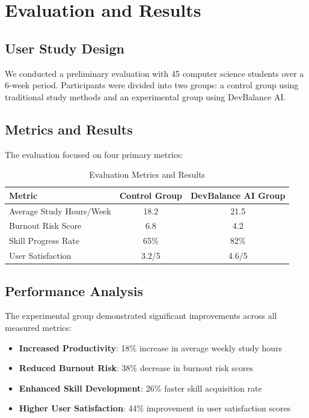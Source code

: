 \documentclass[conference,10pt]{IEEEtran}
\begin{document}
\section{Evaluation and Results}

\subsection{User Study Design}

We conducted a preliminary evaluation with 45 computer science students over a 6-week period. Participants were divided into two groups: a control group using traditional study methods and an experimental group using DevBalance AI.

\subsection{Metrics and Results}

The evaluation focused on four primary metrics:

\begin{table}[h]
\centering
\caption{Evaluation Metrics and Results}
\begin{tabular}{lcc}
\toprule
\textbf{Metric} & \textbf{Control Group} & \textbf{DevBalance AI Group} \\
\midrule
Average Study Hours/Week & 18.2 & 21.5 \\
Burnout Risk Score & 6.8 & 4.2 \\
Skill Progress Rate & 65\% & 82\% \\
User Satisfaction & 3.2/5 & 4.6/5 \\
\bottomrule
\end{tabular}
\end{table}

\subsection{Performance Analysis}

The experimental group demonstrated significant improvements across all measured metrics:

\begin{itemize}
\item \textbf{Increased Productivity}: 18\% increase in average weekly study hours
\item \textbf{Reduced Burnout Risk}: 38\% decrease in burnout risk scores
\item \textbf{Enhanced Skill Development}: 26\% faster skill acquisition rate
\item \textbf{Higher User Satisfaction}: 44\% improvement in user satisfaction scores
\end{itemize}
\end{document}
